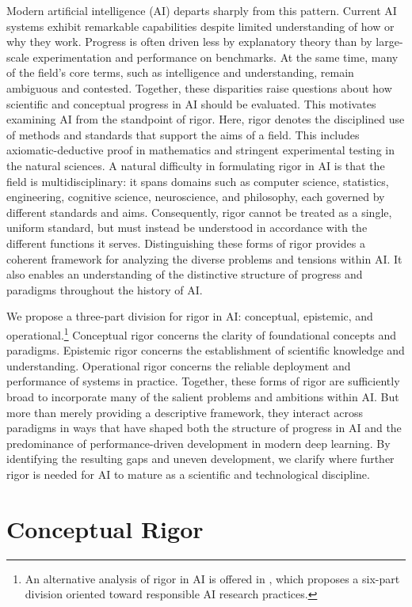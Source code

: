 \documentclass{article}
\begin{document}
Modern artificial intelligence (AI) departs sharply from this pattern.
Current AI systems exhibit remarkable capabilities despite limited understanding of how or why they work.
Progress is often driven less by explanatory theory than by large-scale experimentation and performance on benchmarks.
At the same time, many of the field’s core terms, such as intelligence and understanding, remain ambiguous and contested.
Together, these disparities raise questions about how scientific and conceptual progress in AI should be evaluated.
This motivates examining AI from the standpoint of rigor.
Here, rigor denotes the disciplined use of methods and standards that support the aims of a field.
This includes axiomatic-deductive proof in mathematics and stringent experimental testing in the natural sciences.
A natural difficulty in formulating rigor in AI is that the field is multidisciplinary: it spans domains such as computer science, statistics, engineering, cognitive science, neuroscience, and philosophy, each governed by different standards and aims.
Consequently, rigor cannot be treated as a single, uniform standard, but must instead be understood in accordance with the different functions it serves.
Distinguishing these forms of rigor provides a coherent framework for analyzing the diverse problems and tensions within AI.
It also enables an understanding of the distinctive structure of progress and paradigms throughout the history of AI.

We propose a three-part division for rigor in AI: conceptual, epistemic, and operational.\footnote{An alternative analysis of rigor in AI is offered in \cite{olteanu2025rigor}, which proposes a six-part division oriented toward responsible AI research practices.}
Conceptual rigor concerns the clarity of foundational concepts and paradigms.
Epistemic rigor concerns the establishment of scientific knowledge and understanding.
Operational rigor concerns the reliable deployment and performance of systems in practice.
Together, these forms of rigor are sufficiently broad to incorporate many of the salient problems and ambitions within AI.
But more than merely providing a descriptive framework, they interact across paradigms in ways that have shaped both the structure of progress in AI and the predominance of performance-driven development in modern deep learning.
By identifying the resulting gaps and uneven development, we clarify where further rigor is needed for AI to mature as a scientific and technological discipline.


\section{Conceptual Rigor}
\label{sec:ConceptualRigor}
\end{document}
